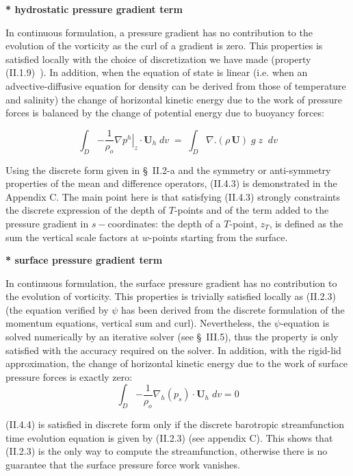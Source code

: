 \documentclass[../tex_main/NEMO_manual]{subfiles}
\begin{document}
\textbf{* hydrostatic pressure gradient term}

In continuous formulation, a pressure gradient has no contribution to the evolution of the vorticity as
the curl of a gradient is zero.
This properties is satisfied locally with the choice of discretization we have made (property (II.1.9)~).
In addition, when the equation of state is linear
(i.e. when an advective-diffusive equation for density can be derived from those of temperature and salinity)
the change of horizontal kinetic energy due to the work of pressure forces is balanced by the change of
potential energy due to buoyancy forces:

\begin{equation} \label{eq:hpg_pe}
\int_D {-\frac{1}{\rho_o }\left. {\nabla p^h} \right|_z \cdot {\textbf {U}}_h \;dv} \;=\;\int_D {\nabla .\left( {\rho \,{\textbf{U}}} \right)\;g\;z\;\;dv}
\end{equation}

Using the discrete form given in {\S}~II.2-a and the symmetry or anti-symmetry properties of
the mean and difference operators, (II.4.3) is demonstrated in the Appendix C.
The main point here is that satisfying (II.4.3) strongly constraints the discrete expression of the depth of 
$T$-points and of the term added to the pressure gradient in $s-$coordinates: the depth of a $T$-point, $z_T$,
is defined as the sum the vertical scale factors at $w$-points starting from the surface.

\textbf{* surface pressure gradient term}

In continuous formulation, the surface pressure gradient has no contribution to the evolution of vorticity.
This properties is trivially satisfied locally as (II.2.3)
(the equation verified by $\psi$ has been derived from the discrete formulation of the momentum equations,
vertical sum and curl).
Nevertheless, the $\psi$-equation is solved numerically by an iterative solver (see {\S}~III.5),
thus the property is only satisfied with the accuracy required on the solver.
In addition, with the rigid-lid approximation, the change of horizontal kinetic energy due to the work of 
surface pressure forces is exactly zero:
\begin{equation} \label{eq:spg}
\int_D {-\frac{1}{\rho_o }\nabla _h } \left( {p_s } \right)\cdot {\textbf{U}}_h \;dv=0
\end{equation}

(II.4.4) is satisfied in discrete form only if
the discrete barotropic streamfunction time evolution equation is given by (II.2.3) (see appendix C).
This shows that (II.2.3) is the only way to compute the streamfunction,
otherwise there is no guarantee that the surface pressure force work vanishes.
\end{document}
